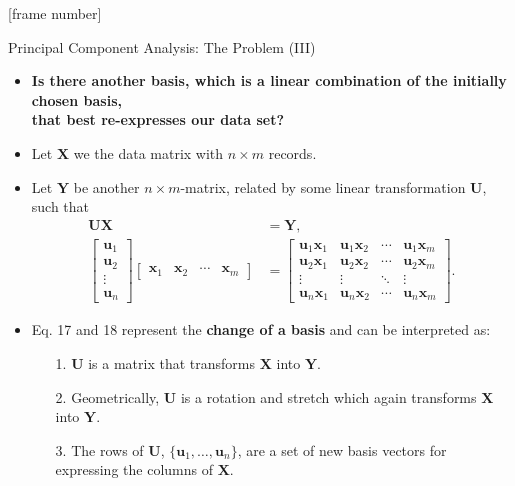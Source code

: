 \documentclass[aspectratio=169,t]{beamer}
\begin{document}
  {
    [frame number]
    \begin{frame}{Principal Component Analysis: The Problem (III)}
    \begin{itemize}
      \item \textbf{Is there another basis, which is a linear combination of the initially chosen basis, \\
      that best re-expresses our data set?}
      \item Let $\mathbf{X}$ we the data matrix with $n \times m$ records.
      \item Let $\mathbf{Y}$ be another $n \times m$-matrix, related by some linear transformation $\mathbf{U}$, such that
      \begin{align}
         \mathbf{U}\mathbf{X} &= \mathbf{Y},\\
         \begin{bmatrix}
           \mathbf{u}_1 \\
           \mathbf{u}_2 \\
           \vdots \\
           \mathbf{u}_n
         \end{bmatrix}
         \begin{bmatrix}
           \mathbf{x}_1 & \mathbf{x}_2 & \cdots & \mathbf{x}_m
         \end{bmatrix} &=
         \begin{bmatrix}
           \mathbf{u}_1\mathbf{x}_1 & \mathbf{u}_1\mathbf{x}_2 & \cdots & \mathbf{u}_1\mathbf{x}_m \\
           \mathbf{u}_2\mathbf{x}_1 & \mathbf{u}_2\mathbf{x}_2 & \cdots & \mathbf{u}_2\mathbf{x}_m \\
           \vdots & \vdots & \ddots & \vdots \\
           \mathbf{u}_n\mathbf{x}_1 & \mathbf{u}_n\mathbf{x}_2 & \cdots & \mathbf{u}_n\mathbf{x}_m
         \end{bmatrix}.
      \end{align}
      \item Eq. 17 and 18 represent the \textbf{change of a basis} and can be interpreted as:
      \begin{itemize}
        \item[1.] $\mathbf{U}$ is a matrix that transforms $\mathbf{X}$ into $\mathbf{Y}$.
        \item[2.] Geometrically, $\mathbf{U}$ is a rotation and stretch which again transforms $\mathbf{X}$ into $\mathbf{Y}$.
        \item[3.] The rows of $\mathbf{U}$, $\{\mathbf{u}_1,\ldots,\mathbf{u}_n\}$, are a set of new basis vectors for expressing the columns of $\mathbf{X}$.
      \end{itemize}
    \end{itemize}
    \end{frame}
  }
\end{document}
